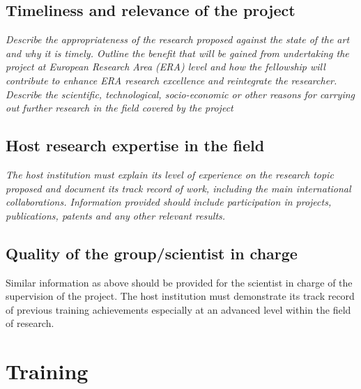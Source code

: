 \documentclass[a4paper,11pt]{article}
\newenvironment{xcomment}{\em}{}
\begin{document}
\begin{bibunit}[../../../../tex/statement2012]
\subsection{Timeliness and relevance of the project}

\begin{xcomment}
Describe the appropriateness of the research proposed against the state of the art and why it is
timely. Outline the benefit that will be gained from undertaking the project at European Research
Area (ERA) level and how the fellowship will contribute to enhance ERA research excellence and
reintegrate the researcher. Describe the scientific, technological, socio-economic or other
reasons for carrying out further research in the field covered by the project
\end{xcomment}

\subsection{Host research expertise in the field}

\begin{xcomment}
The host institution must explain its level of experience on the research topic proposed and
document its track record of work, including the main international collaborations. Information
provided should include participation in projects, publications, patents and any other relevant
results. 
\end{xcomment}


\subsection{Quality of the group/scientist in charge}

Similar information as above should be provided for the scientist in charge of the supervision of
the project. The host institution must demonstrate its track record of previous training
achievements especially at an advanced level within the field of research. 

\end{bibunit}

\newpage
\section{Training}
\end{document}
